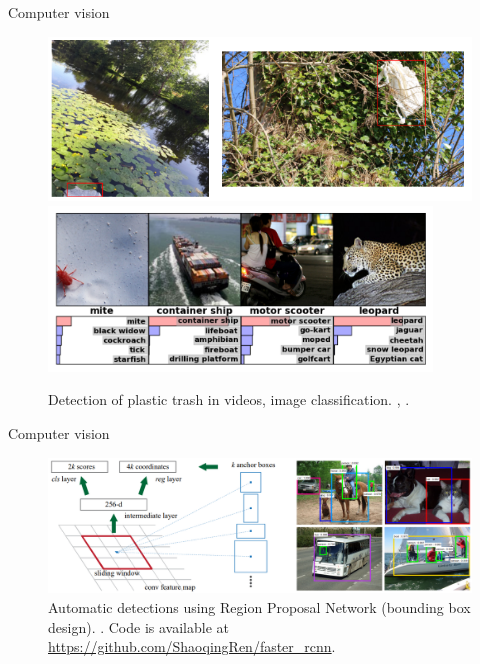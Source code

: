 \documentclass[xcolor={usenames,dvipsnames},handout]{beamer}
\begin{document}
\begin{frame}{Computer vision}
\begin{figure}
\includegraphics[width=0.7\linewidth]{plastic}
\includegraphics[width=0.7\linewidth]{image_classif}
\caption{Detection of plastic trash in videos, image classification.  {\tiny \href{https://proceedings.neurips.cc/paper/2012/file/c399862d3b9d6b76c8436e924a68c45b-Paper.pdf}{}},   {\tiny \href{PlasticTrash}{}}.}
\end{figure}
\end{frame}

\begin{frame}{Computer vision}
\begin{figure}
\includegraphics[width=0.9\linewidth]{image_bbox}
\caption{Automatic detections using Region Proposal Network (bounding box design). {\tiny \href{https://papers.nips.cc/paper/2015/hash/14bfa6bb14875e45bba028a21ed38046-Abstract.html}{}}. Code is available at \url{https://github.com/ShaoqingRen/faster_rcnn}.}
\end{figure}
\end{frame}
\end{document}
